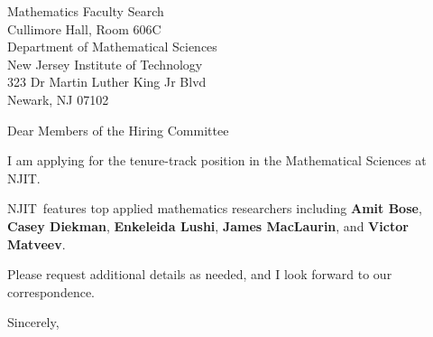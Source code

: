 




	
	
	\def\School{NJIT}
	
	\begin{letter}
		{Mathematics Faculty Search\\
			Cullimore Hall, Room 606C\\
			Department of Mathematical Sciences\\
			New Jersey Institute of Technology\\
			323 Dr Martin Luther King Jr Blvd\\
			Newark, NJ 07102
			
		}
		
		\opening{Dear Members of the Hiring Committee}
		
		
		I am applying for the tenure-track position in the Mathematical Sciences at \School. 
		
		
		
		\School~features top applied mathematics researchers including \textbf{Amit Bose}, \textbf{Casey Diekman}, \textbf{Enkeleida Lushi}, \textbf{James MacLaurin}, and \textbf{Victor Matveev}. 
		
		
		
		
		
		Please request additional details as needed, and I look forward to our correspondence.
		
		\closing{Sincerely,}
	\end{letter}
